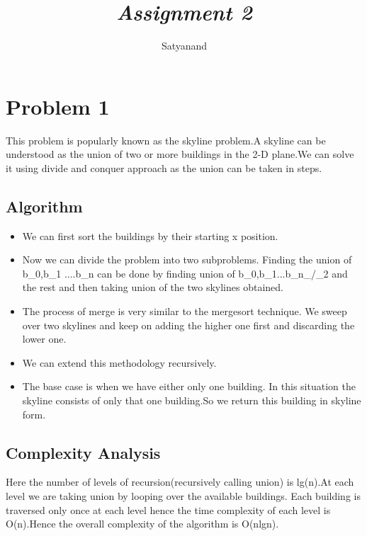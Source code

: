 \documentclass[12pt]{article}
\title{{\it Assignment 2\/} }
\author
{Satyanand\\
\normalize{\textbf{14EC10049}}
}
\date{}
\begin{document}
 


\baselineskip24pt


\maketitle 

\section*{Problem 1}


This problem is popularly known as the skyline problem.A skyline can be understood as the union of two or more buildings in the 2-D plane.We can solve it using divide and conquer approach as the union can be taken in steps.


\subsection*{Algorithm}
\begin{itemize}

    
    \item We can first sort the buildings by their starting x position.
\item Now we can divide the problem into two subproblems. Finding the union of b\_0,b\_1 ....b\_n can be done by finding union of b\_0,b\_1...b\_n\_/\_2 and the rest and then taking union of the two skylines obtained.
\item The process of merge is very similar to the mergesort technique. We sweep over two skylines and keep on adding the higher one first and discarding the lower one.
\item We can extend this methodology recursively.
\item The base case is when we have either only one building. In this situation the skyline consists of only that one building.So we return this building in skyline form.
\end{itemize}
\subsection*{Complexity Analysis}
Here the number of levels of recursion(recursively calling union) is lg(n).At each level we are taking union by looping over the available buildings. Each building is traversed only once at each level hence the time complexity of each level is O(n).Hence the overall complexity of the algorithm is O(nlgn).
\end{document}
